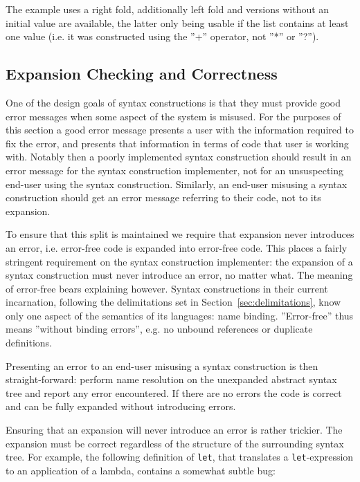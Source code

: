 \documentclass{kththesis}
\begin{document}
The example uses a right fold, additionally left fold and versions without an initial value are available, the latter only being usable if the list contains at least one value (i.e. it was constructed using the ''+'' operator, not ''*'' or ''?'').

\subsection{Expansion Checking and Correctness} \label{sec:expansion-checking}

One of the design goals of syntax constructions is that they must provide good error messages when some aspect of the system is misused. For the purposes of this section a good error message presents a user with the information required to fix the error, and presents that information in terms of code that user is working with. Notably then a poorly implemented syntax construction should result in an error message for the syntax construction implementer, not for an unsuspecting end-user using the syntax construction. Similarly, an end-user misusing a syntax construction should get an error message referring to their code, not to its expansion.

To ensure that this split is maintained we require that expansion never introduces an error, i.e. error-free code is expanded into error-free code. This places a fairly stringent requirement on the syntax construction implementer: the expansion of a syntax construction must never introduce an error, no matter what. The meaning of error-free bears explaining however. Syntax constructions in their current incarnation, following the delimitations set in Section~\ref{sec:delimitations}, know only one aspect of the semantics of its languages: name binding. ''Error-free'' thus means ''without binding errors'', e.g. no unbound references or duplicate definitions.

Presenting an error to an end-user misusing a syntax construction is then straight-forward: perform name resolution on the unexpanded abstract syntax tree and report any error encountered. If there are no errors the code is correct and can be fully expanded without introducing errors.

Ensuring that an expansion will never introduce an error is rather trickier. The expansion must be correct regardless of the structure of the surrounding syntax tree. For example, the following definition of \texttt{let}, that translates a \texttt{let}-expression to an application of a lambda, contains a somewhat subtle bug:
\end{document}
